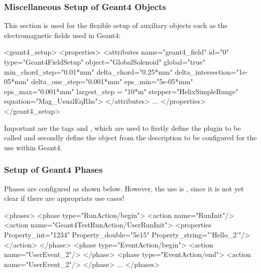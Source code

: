 \subsubsection{Miscellaneous Setup of Geant4 Objects}
\label{sec:ddg4-setup-xml-geant4-objects}

\noindent
This section is used for the flexible setup of auxiliary objects such as the 
electromagnetic fields used in Geant4:
\begin{code}
  <geant4_setup>
    <properties>
      <attributes name="geant4_field"
            id="0"
            type="Geant4FieldSetup"
            object="GlobalSolenoid"
            global="true"
            min_chord_step="0.01*mm"
            delta_chord="0.25*mm"
            delta_intersection="1e-05*mm"
            delta_one_step="0.001*mm"
            eps_min="5e-05*mm"
            eps_max="0.001*mm"
            largest_step = "10*m"
            stepper="HelixSimpleRunge"
            equation="Mag_UsualEqRhs">
      </attributes>
      ...
    </properties>
  </geant4_setup>
\end{code}
Important are the tags  and , which are used to firstly
define the plugin to be called and secondly define the object from the \DDhep
description to be configured for the use within Geant4.

\subsubsection{Setup of Geant4 Phases}
\label{sec:ddg4-setup-xml-geant4-phases}

\noindent
Phases are configured as shown below.
However, the use is ,
since it is not yet clear if there are appropriate use cases!
\begin{code}
  <phases>
    <phase type="RunAction/begin">
      <action name="RunInit"/>
      <action name="Geant4TestRunAction/UserRunInit">
    <properties Property_int="1234"
            Property_double="5e15"
            Property_string="'Hello_2'"/>
      </action>
    </phase>
    <phase type="EventAction/begin">
      <action name="UserEvent_2"/>
    </phase>
    <phase type="EventAction/end">
      <action name="UserEvent_2"/>
    </phase>
    ...
  </phases>
\end{code}

